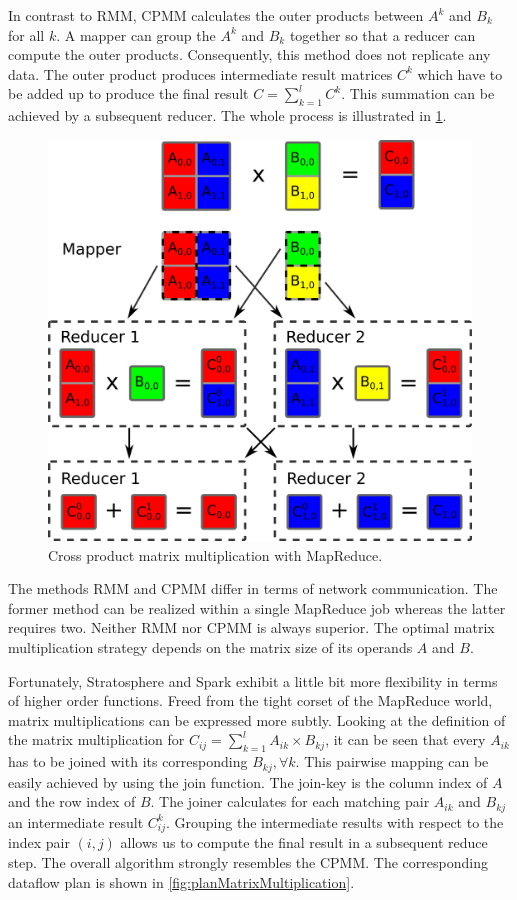 In contrast to RMM, CPMM calculates the outer products between $A^k$ and $B_k$ for all $k$.
A mapper can group the $A^k$ and $B_k$ together so that a reducer can compute the outer products.
Consequently, this method does not replicate any data.
The outer product produces intermediate result matrices $C^k$ which have to be added up to produce the final result $C=\sum_{k=1}^{l} C^k$.
This summation can be achieved by a subsequent reducer.
The whole process is illustrated in \cref{fig:CPMM}.

\begin{figure}[!h]
	\centering
	\includegraphics[width=0.4\linewidth]{images/cpmm.png}
	\caption{Cross product matrix multiplication with MapReduce.}
	\label{fig:CPMM}
\end{figure}

The methods RMM and CPMM differ in terms of network communication.
The former method can be realized within a single MapReduce job whereas the latter requires two.
Neither RMM nor CPMM is always superior.
The optimal matrix multiplication strategy depends on the matrix size of its operands $A$ and $B$.

Fortunately, Stratosphere and Spark exhibit a little bit more flexibility in terms of higher order functions.
Freed from the tight corset of the MapReduce world, matrix multiplications can be expressed more subtly.
Looking at the definition of the matrix multiplication for $C_{ij}=\sum_{k=1}^{l}A_{ik}\times B_{kj}$, it can be seen that every $A_{ik}$ has to be joined with its corresponding $B_{kj},\forall k$.
This pairwise mapping can be easily achieved by using the join function.
The join-key is the column index of $A$ and the row index of $B$.
The joiner calculates for each matching pair $A_{ik}$ and $B_{kj}$ an intermediate result $C_{ij}^k$.
Grouping the intermediate results with respect to the index pair $(i,j)$ allows us to compute the final result in a subsequent reduce step.
The overall algorithm strongly resembles the CPMM.
The corresponding dataflow plan is shown in \cref{fig:planMatrixMultiplication}.

